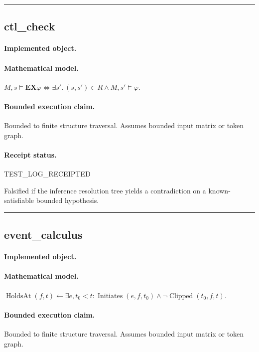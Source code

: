 \vspace{1em}\hrule\vspace{1em}
\subsection{ctl\_check}
\paragraph{Implemented object.} 
\paragraph{Mathematical model.} $M,s\models \mathbf{EX}\varphi \iff \exists s'.\ (s,s')\in R \land M,s'\models\varphi.$
\paragraph{Bounded execution claim.} Bounded to finite structure traversal. Assumes bounded input matrix or token graph.
\paragraph{Receipt status.} TEST\_LOG\_RECEIPTED
\begin{falsifier}
Falsified if the inference resolution tree yields a contradiction on a known-satisfiable bounded hypothesis.
\end{falsifier}

\vspace{1em}\hrule\vspace{1em}
\subsection{event\_calculus}
\paragraph{Implemented object.} 
\paragraph{Mathematical model.} $\operatorname{HoldsAt}(f,t) \leftarrow \exists e,t_0<t: \operatorname{Initiates}(e,f,t_0) \land \neg\operatorname{Clipped}(t_0,f,t).$
\paragraph{Bounded execution claim.} Bounded to finite structure traversal. Assumes bounded input matrix or token graph.
